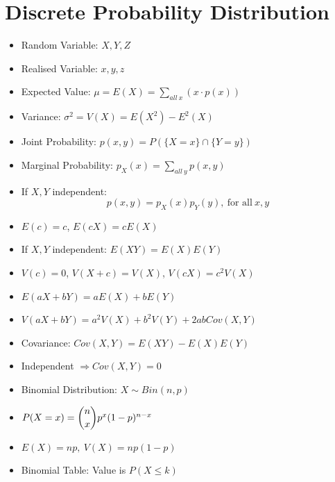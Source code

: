 \documentclass[%
 aip,
 jmp,%
 amsmath,amssymb,
 reprint,%
]{revtex4-1}
\begin{document}
\section{Discrete Probability Distribution}
\begin{itemize}[label={}]
\item Random Variable: $X, Y, Z$
\item Realised Variable: $x, y, z$
\item Expected Value: $\mu = E(X) = \sum_{all\ x}(x \cdot p(x))$
\item Variance: $\sigma^2 = V(X) = E(X^2) - E^2(X)$
\item Joint Probability: $p(x,y)=P(\{X=x\} \cap \{Y=y\})$
\item Marginal Probability: $p_X(x) = \sum_{all\ y}p(x,y)$
\item If $X,Y$ independent: $$p(x,y)=p_X(x)p_Y(y),\ \textrm{for all}\ x,y$$
\item $E(c)=c$, $E(cX)=cE(X)$
\item If $X,Y$ independent: $E(XY) = E(X)E(Y)$
\item $V(c)=0$, $V(X+c)=V(X)$, $V(cX)=c^2V(X)$
\item $E(aX+bY) = aE(X) + bE(Y)$
\item $V(aX+bY) = a^2V(X) + b^2V(Y) + 2abCov(X,Y)$
\item Covariance: $Cov(X,Y)= E(XY) - E(X)E(Y)$
\item Independent $\Rightarrow Cov(X,Y)=0$

\item Binomial Distribution: $X \sim Bin(n,p)$
\item $P(X=x) = \dbinom{n}{x}p^x(1-p)^{n-x}$
\item $E(X)=np,\ V(X)=np(1-p)$
\item Binomial Table: Value is $P(X \leq k)$
\end{itemize}
\end{document}
